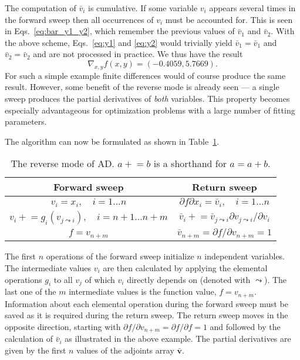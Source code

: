 \documentclass{article}
\begin{document}
The computation of $\bar v_i$ is cumulative. If some variable $v_i$ appears several times in the forward sweep then all occurrences of $v_i$ must be accounted for. This is seen in Eqs.~\eqref{eq:bar_y1_y2}, which remember the previous values of $\bar v_1$ and $\bar v_2$. With the above scheme, Eqs.~\eqref{eq:y1} and \eqref{eq:y2} would trivially yield $\bar v_1 = \bar v_1$ and $\bar v_2 = \bar v_2$ and are not processed in practice. We thus have the result
\begin{equation}
  \label{eq:Fgrad}
  \nabla_{x,y} f(x,y) = (-0.4059,5.7669).
\end{equation}
For such a simple example finite differences would of course produce the same result. However, some benefit of the reverse mode is already seen --- a single sweep produces the partial derivatives of \textit{both} variables. This property becomes especially advantageous for optimization problems with a large number of fitting parameters.

The algorithm can now be formulated as shown in Table~\ref{tab:AD}.
\begin{table}[h]
  \centering
  \caption{The reverse mode of AD. $a\mathrel{+}=b$ is a shorthand for
    $a = a + b$.}
  \begin{tabular}{c|c}
    Forward sweep & Return sweep \\ \hline
    $v_i = x_i, \quad i=1\ldots n$ & $\partial f\partial x_i = \bar
                                     v_i, \quad i=1\ldots n$ \\
    $v_i \mathrel{+}= g_i(v_{j \leadsto i}), \quad i=n+1\ldots n+m$
                  & $\bar v_i \mathrel{+}= \bar v_{j \leadsto
                    i} \partial v_{j \leadsto i}/\partial v_i$ \\
    $f = v_{n+m}$ & $\bar v_{n+m} = \partial f/\partial v_{n+m} = 1$
  \end{tabular}
  \label{tab:AD}
\end{table}
The first $n$ operations of the forward sweep initialize $n$ independent variables. The intermediate values $v_i$ are then calculated by applying the elemental operations $g_i$ to all $v_j$ of which $v_i$ directly depends on (denoted with $\leadsto$). The last one of the $m$ intermediate values is the function value, $f = v_{n+m}$. Information about each elemental operation during the forward sweep must be saved as it is required during the return sweep. The return sweep moves in the opposite direction, starting with $\partial f/\partial v_{n+m} = \partial f/\partial f = 1$ and followed by the calculation of $\bar v_i$ as illustrated in the above example. The partial derivatives are given by the first $n$ values of the adjoints array $\bm{\bar v}$.
\end{document}
